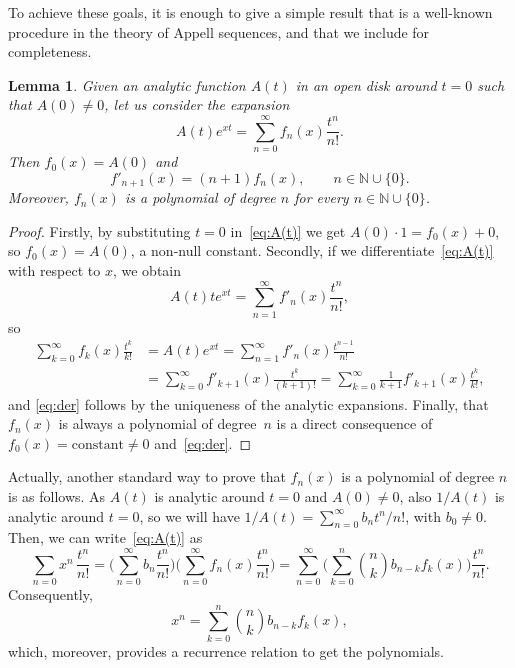 \documentclass[11pt,a4paper]{amsart}
\newcommand{\N}{\mathbb{N}}
\theoremstyle{plain}
\theoremstyle{plain}
\theoremstyle{plain}
\newtheorem{lemma}[theor]{Lemma}
\begin{document}
To achieve these goals, it is enough to give a simple result that is a well-known procedure in the theory of Appell sequences, and that we include for completeness.

\begin{lemma}
\label{lem:A(t)}
Given an analytic function $A(t)$ in an open disk around $t=0$ such that $A(0) \ne 0$, 
let us consider the expansion
\begin{equation}
\label{eq:A(t)}
  A(t) e^{xt} = \sum_{n=0}^{\infty} f_n(x) \frac{t^n}{n!}.
\end{equation}
Then $f_0(x) = A(0)$ and 
\begin{equation}
\label{eq:der}
  f'_{n+1}(x) = (n+1) f_n(x), \qquad n \in \N \cup \{0\}.
\end{equation}
Moreover, $f_n(x)$ is a polynomial of degree $n$ for every $n \in \N \cup \{0\}$.
\end{lemma}

\begin{proof}
Firstly, by substituting $t=0$ in~\eqref{eq:A(t)} we get $A(0) \cdot 1 = f_0(x) + 0$, so $f_0(x) = A(0)$, a non-null constant.
Secondly, if we differentiate~\eqref{eq:A(t)} with respect to $x$, we obtain
\[
  A(t) t e^{xt} = \sum_{n=1}^{\infty} f'_n(x) \frac{t^n}{n!},
\]
so
\begin{align*}
  \sum_{k=0}^{\infty} f_k(x) \frac{t^k}{k!} 
  &= A(t) e^{xt} = \sum_{n=1}^{\infty} f'_n(x) \frac{t^{n-1}}{n!} \\
  &= \sum_{k=0}^{\infty} f'_{k+1}(x) \frac{t^{k}}{(k+1)!}
  = \sum_{k=0}^{\infty} \frac{1}{k+1} f'_{k+1}(x) \frac{t^{k}}{k!},
\end{align*}
and \eqref{eq:der} follows by the uniqueness of the analytic expansions.
Finally, that $f_n(x)$ is always a polynomial of degree~$n$ is a direct
consequence of $f_0(x) = \text{constant} \ne 0$ and~\eqref{eq:der}.
\end{proof}

Actually, another standard way to prove that $f_n(x)$ is a polynomial of degree $n$
is as follows. As $A(t)$ is analytic around $t=0$ and $A(0) \ne 0$, also
$1/A(t)$ is analytic around $t=0$, so we will have $1/A(t) = \sum_{n=0}^{\infty} b_n t^n/n!$,
with $b_0 \ne 0$. Then, we can write~\eqref{eq:A(t)} as
\[
  \sum_{n=0} x^n \,\frac{t^n}{n!} 
  = \bigg(\sum_{n=0}^{\infty} b_n \frac{t^n}{n!}\bigg) \bigg(\sum_{n=0}^{\infty} f_n(x) \frac{t^n}{n!}\bigg)
  = \sum_{n=0}^{\infty} \bigg(\sum_{k=0}^n \binom{n}{k} b_{n-k} f_{k}(x) \bigg) \frac{t^n}{n!}.
\]
Consequently,
\[
  x^n = \sum_{k=0}^n \binom{n}{k} b_{n-k} f_{k}(x),
\]
which, moreover, provides a recurrence relation to get the polynomials.
\end{document}

